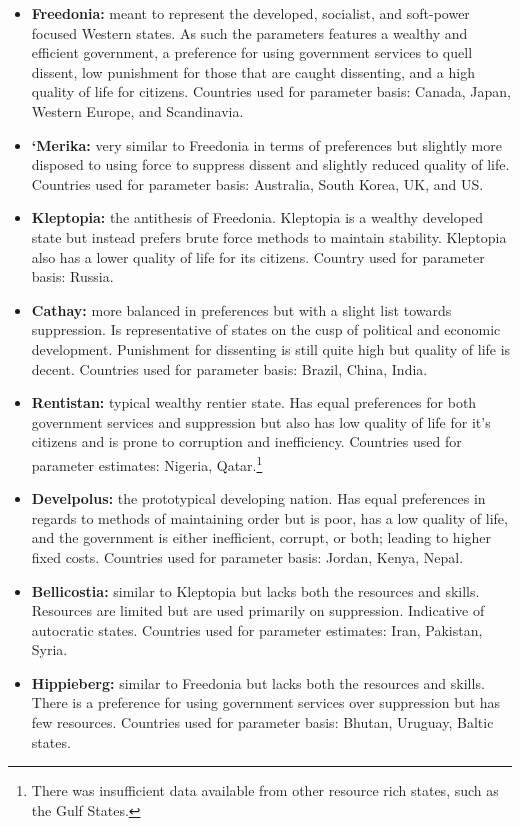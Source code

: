 \documentclass[12pt]{article}
\begin{document}
\begin{spacing}{1.5}
\begin{itemize}
	\item \textbf{Freedonia:} meant to represent the developed, socialist, and soft-power focused Western states. As such the parameters features a wealthy and efficient government, a preference for using government services to quell dissent, low punishment for those that are caught dissenting, and a high quality of life for citizens. Countries used for parameter basis: Canada, Japan, Western Europe, and Scandinavia. 
	\item \textbf{`Merika:} very similar to Freedonia in terms of preferences but slightly more disposed to using force to suppress dissent and slightly reduced quality of life. Countries used for parameter basis: Australia, South Korea, UK, and US. 
	\item \textbf{Kleptopia:} the antithesis of Freedonia. Kleptopia is a wealthy developed state but instead prefers brute force methods to maintain stability. Kleptopia also has a lower quality of life for its citizens. Country used for parameter basis: Russia.  
	\item \textbf{Cathay:} more balanced in preferences but with a slight list towards suppression. Is representative of states on the cusp of political and economic development. Punishment for dissenting is still quite high but quality of life is decent. Countries used for parameter basis: Brazil, China, India.   
	\item \textbf{Rentistan:} typical wealthy rentier state. Has equal preferences for both government services and suppression but also has low quality of life for it's citizens and is prone to corruption and inefficiency. Countries used for parameter estimates: Nigeria, Qatar.\footnote{There was insufficient data available from other resource rich states, such as the Gulf States.} 
	\item \textbf{Develpolus:} the prototypical developing nation. Has equal preferences in regards to methods of maintaining order but is poor, has a low quality of life, and the government is either inefficient, corrupt, or both; leading to higher fixed costs. Countries used for parameter basis: Jordan, Kenya, Nepal.  	
	\item \textbf{Bellicostia:} similar to Kleptopia but lacks both the resources and skills. Resources are limited but are used primarily on suppression. Indicative of autocratic states.  Countries used for parameter estimates: Iran, Pakistan, Syria. 
	\item \textbf{Hippieberg:} similar to Freedonia but lacks both the resources and skills. There is a preference for using government services over suppression but has few resources. Countries used for parameter basis: Bhutan, Uruguay, Baltic states.  
\end{itemize}


\end{spacing}
\end{document}
